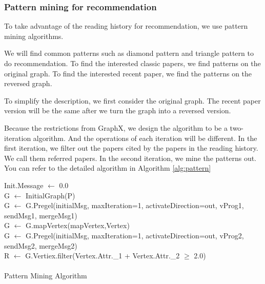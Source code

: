 \subsubsection{Pattern mining for recommendation}

To take advantage of the reading history for recommendation, we use pattern mining algorithms. 

We will find common patterns such as diamond pattern and triangle pattern to do recommendation. To find the interested classic papers, we find patterns on the original graph. To find the interested recent paper, we find the patterns on the reversed graph.

To simplify the description, we first consider the original graph. The recent paper version will be the same after we turn the graph into a reversed version.

Because the restrictions from GraphX, we design the algorithm to be a two-iteration algorithm. And the operations of each iteration will be different. In the first iteration, we filter out the papers cited by the papers in the reading history. We call them referred papers. In the second iteration, we mine the patterns out. You can refer to the detailed algorithm in Algorithm \ref{alg:pattern}

\begin{algorithm}
Init.Message $\gets$ 0.0\\
G $\gets$ InitialGraph(P)\\
 G $\gets$ G.Pregel(initialMsg, maxIteration=1, activateDirection=out, vProg1, sendMsg1, mergeMsg1)\\
G $\gets$ G.mapVertex(mapVertex,Vertex)\\
 G $\gets$ G.Pregel(initialMsg, maxIteration=1, activateDirection=out, vProg2, sendMsg2, mergeMsg2)\\
R $\gets$ G.Vertiex.filter(Vertex.Attr.\_1 + Vertex.Attr.\_2 $\geq$ 2.0)\\
\\
 \caption{Pattern Mining Algorithm}
 \label{alg:pattern}
\end{algorithm}





